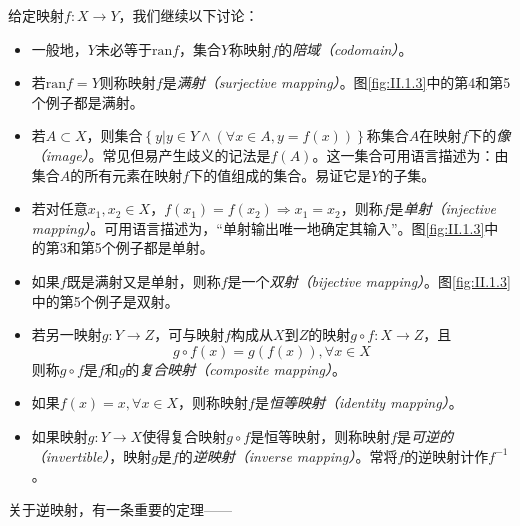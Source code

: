 \documentclass[../main.tex]{subfiles}
\begin{document}
给定映射$f:X\rightarrow Y$，我们继续以下讨论：
\begin{itemize}
    \item 一般地，$Y$未必等于$\mathrm{ran}f$，集合$Y$称映射$f$的\emph{陪域（codomain）}。
    \item 若$\mathrm{ran}f=Y$则称映射$f$是\emph{满射（surjective mapping）}。图\ref{fig:II.1.3}中的第4和第5个例子都是满射。
    \item 若$A\subset X$，则集合$\left\{y|y\in Y\wedge\left(\forall x\in A,y=f\left(x\right)\right)\right\}$称集合$A$在映射$f$下的\emph{像（image）}。常见但易产生歧义的记法是$f\left(A\right)$。这一集合可用语言描述为：由集合$A$的所有元素在映射$f$下的值组成的集合。易证它是$Y$的子集。
    \item 若对任意$x_1,x_2\in X$，$f\left(x_1\right)=f\left(x_2\right)\Rightarrow x_1=x_2$，则称$f$是\emph{单射（injective mapping）}。可用语言描述为，“单射输出唯一地确定其输入”。图\ref{fig:II.1.3}中的第3和第5个例子都是单射。
    \item 如果$f$既是满射又是单射，则称$f$是一个\emph{双射（bijective mapping）}。图\ref{fig:II.1.3}中的第5个例子是双射。
    \item 若另一映射$g:Y\rightarrow Z$，可与映射$f$构成从$X$到$Z$的映射$g\circ f:X\rightarrow Z$，且
          \[
              g\circ f\left(x\right)=g\left(f\left(x\right)\right),\forall x\in X
          \]
          则称$g\circ f$是$f$和$g$的\emph{复合映射（composite mapping）}。
    \item 如果$f\left(x\right)=x,\forall x\in X$，则称映射$f$是\emph{恒等映射（identity mapping）}。
    \item 如果映射$g:Y\rightarrow X$使得复合映射$g\circ f$是恒等映射，则称映射$f$是\emph{可逆的（invertible）}，映射$g$是$f$的\emph{逆映射（inverse mapping）}。常将$f$的逆映射计作$f^{-1}$。
\end{itemize}

关于逆映射，有一条重要的定理——
\end{document}
